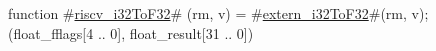 function #\hyperref[sailRISCVzriscvzyi32ToF32]{riscv\_i32ToF32}# (rm, v) = {
  #\hyperref[sailRISCVzexternzyi32ToF32]{extern\_i32ToF32}#(rm, v);
  (float_fflags[4 .. 0], float_result[31 .. 0])
}
